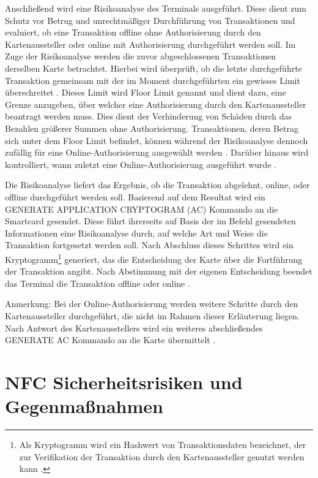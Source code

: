 Anschließend wird eine Risikoanalyse des Terminals ausgeführt. Diese dient zum Schutz vor Betrug und unrechtmäßiger Durchführung von Transaktionen und evaluiert, ob eine Transaktion offline ohne Authorisierung durch den Kartenaussteller oder online mit Authorisierung durchgeführt werden soll. Im Zuge der Risikoanalyse werden die zuvor abgeschlossenen Transaktionen derselben Karte betrachtet. Hierbei wird überprüft, ob die letzte durchgeführte Transaktion gemeinsam mit der im Moment durchgeführten ein gewisses Limit überschreitet \cite{emvbook3}. Dieses Limit wird Floor Limit genannt und dient dazu, eine Grenze anzugeben, über welcher eine Authorisierung durch den Kartenaussteller beantragt werden muss. Dies dient der Verhinderung von Schäden durch das Bezahlen größerer Summen ohne Authorisierung. Transaktionen, deren Betrag sich unter dem Floor Limit befindet, können während der Risikoanalyse dennoch zufällig für eine Online-Authorisierung ausgewählt werden \cite{emvbook3, posRiskManagement}. Darüber hinaus wird kontrolliert, wann zuletzt eine Online-Authorisierung ausgeführt wurde \cite{emvbook3}.

Die Risikoanalyse liefert das Ergebnis, ob die Transaktion abgelehnt, online, oder offline durchgeführt werden soll. Basierend auf dem Resultat wird ein GENERATE APPLICATION CRYPTOGRAM (AC) Kommando an die Smartcard gesendet. Diese führt ihrerseits auf Basis der im Befehl gesendeten Informationen eine Risikoanalyse durch, auf welche Art und Weise die Transaktion fortgesetzt werden soll. Nach Abschluss dieses Schrittes wird ein Kryptogramm\footnote{Als Kryptogramm wird ein Hashwert von Transaktionsdaten bezeichnet, der zur Verifikation der Transaktion durch den Kartenaussteller genutzt werden kann \cite{howemvpaymentworks}.} generiert, das die Entscheidung der Karte über die Fortführung der Transaktion angibt. Nach Abstimmung mit der eigenen Entscheidung beendet das Terminal die Transaktion offline oder online \cite{howemvpaymentworks, emvbook3}. 

Anmerkung: Bei der Online-Authorisierung werden weitere Schritte durch den Kartenaussteller durchgeführt, die nicht im Rahmen dieser Erläuterung liegen. Nach Antwort des Kartenausstellers wird ein weiteres abschließendes GENERATE AC Kommando an die Karte übermittelt \cite{howemvpaymentworks}. 

\section{NFC Sicherheitsrisiken und Gegenmaßnahmen}

